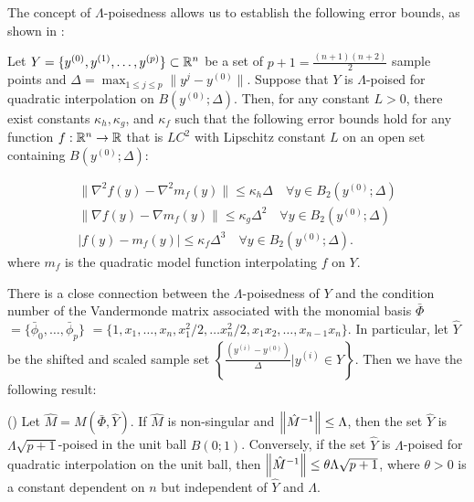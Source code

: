 The concept of $\Lambda$-poisedness allows us to establish the following error bounds, as shown in 
 \cite[Theorem 3.16]{introduction_book}:

\begin{theorem}
\label{quadratic_errors}  
Let $Y = \{y^{(0)}, y^{(1)}, \ldots, y^{(p)}\} \subset \mathbb R^n$ be a set of $p+1=\frac{(n+1)(n+2)}{2}$ sample points and $\Delta = \max_{1 \le j \le p} \|y^j-y^{(0)}\|$.  Suppose that $Y$ is $\Lambda$-poised for quadratic interpolation on $B(y^{(0)}; \Delta)$.    Then, for any constant $L > 0$, there exist constants $\kappa_{h}, \kappa_{g}$, and $\kappa_{f}$ such that the following error bounds hold for any function $f:\mathbb R^n \rightarrow \mathbb R$ that is $LC^2$ with Lipschitz constant $L$ on an open set containing $B(y^{(0)};\Delta)$:

\begin{align}
\|\nabla^2 f(y) - \nabla^2 m_f(y)\| \le \kappa_{h} \Delta \quad \forall y \in B_2(y^{(0)}; \Delta) \label{error_in_hessian}\\
\|\nabla f(y) - \nabla m_f(y)\| \le \kappa_{g} \Delta^2 \quad \forall y \in B_2(y^{(0)}; \Delta) \label{error_in_gradient} \\
|f(y) - m_f(y) | \le \kappa_{f} \Delta^3 \quad \forall y \in B_2(y^{(0)}; \Delta). \label{error_in_function} 
\end{align}
where $m_f$ is the quadratic model function interpolating $f$ on $Y$.
\end{theorem}

There is a close connection between the $\Lambda$-poisedness of $Y$ and the condition number of the Vandermonde matrix associated with the monomial basis $\bar{\Phi}$ $= \{ \bar{\phi}_0, \ldots, \bar{\phi}_p\}$ $=\{1, x_1, \ldots, x_n, x_1^2/2, \ldots x_n^2/2,x_1 x_2, \ldots, x_{n-1}x_{n}\}$.  In particular, let $\hat{Y}$ be the shifted and scaled sample set $\left\{\frac{(y^{(i)}-y^{(0)})}{\Delta}|y^{(i)} \in Y\right\}$.
Then we have the following result:

\begin{theorem}\label{Lambda_poised_error_bounds}
(\cite[Theorem 3.14]{introduction_book}) Let $\hat{M} = M(\bar{\Phi},\hat{Y})$.  
If $\hat{M}$ is  non-singular and ${\left\|\hat{M}^{-1}\right\|} \le \Lambda$,   
then the set $\hat{Y}$ is $\Lambda  \sqrt{p+1}$-poised in the unit ball $B(0;1)$.  
Conversely, if the set $\hat{Y}$ is $\Lambda$-poised for quadratic interpolation on the unit ball, 
then ${\left\|\hat{M}^{-1}\right\|} \le \theta \Lambda \sqrt{p+1}$, where $\theta > 0$ is a 
constant dependent on $n$ but independent of $\hat{Y}$ and $\Lambda$.
\end{theorem}

